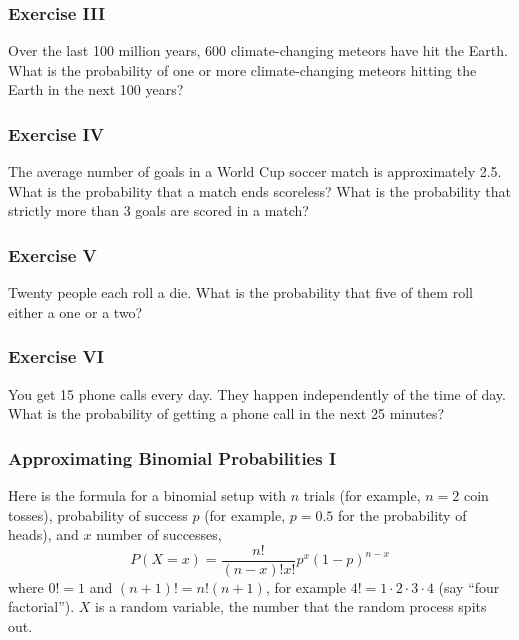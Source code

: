 \documentclass[xcolor=dvipsnames]{beamer}
\begin{document}
\begin{frame}
  \frametitle{Exercise III}
  {\ubung} Over the last 100 million years, 600 climate-changing
  meteors have hit the Earth. What is the probability of one or more
  climate-changing meteors hitting the Earth in the next 100 years?
\end{frame}

\begin{frame}
  \frametitle{Exercise IV}
  {\ubung} The average number of goals in a World Cup soccer match is
  approximately 2.5. What is the probability that a match ends
  scoreless? What is the probability that strictly more than 3 goals
  are scored in a match?
\end{frame}

\begin{frame}
  \frametitle{Exercise V}
  {\ubung} Twenty people each roll a die. What is the probability that
  five of them roll either a one or a two?
\end{frame}

\begin{frame}
  \frametitle{Exercise VI} {\ubung} You get 15 phone calls every day.
  They happen independently of the time of day. What is the
  probability of getting a phone call in the next 25 minutes?
\end{frame}

\begin{frame}
  \frametitle{Approximating Binomial Probabilities I}
Here is the formula for a \alert{binomial} setup with $n$ trials (for example,
$n=2$ coin tosses), probability of success $p$ (for example, $p=0.5$ for the
probability of heads), and $x$ number of successes,
\begin{equation}
  \label{eq:iedohdah}
  P(X=x)=\frac{n!}{(n-x)!x!}p^{x}(1-p)^{n-x}
\end{equation}
where $0!=1$ and $(n+1)!=n!(n+1)$, for example
$4!=1\cdot{}2\cdot{}3\cdot{}4$ (say ``four factorial''). $X$ is a
\alert{random variable}, the number that the random process spits out.
\end{frame}
\end{document}
